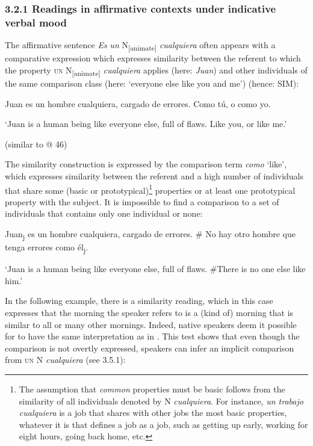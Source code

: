 \documentclass[output=paper]{langscibook}
\begin{document}
\subsubsection{\textbf{3.2.1} \textbf{Readings} \textbf{in} \textbf{affirmative} \textbf{contexts} \textbf{under} \textbf{indicative} \textbf{verbal} \textbf{mood}}

The affirmative sentence \textit{Es} \textit{un} N\textsubscript{[animate]} \textit{cualquiera} often appears with a comparative expression which expresses similarity between the referent to which the property \textsc{un} N\textsubscript{[animate]} \textit{cualquiera} applies (here: \textit{Juan}) and other individuals of the same comparison class (here: ‘everyone else like you and me’) (hence: SIM):

  Juan es un hombre cualquiera, cargado de errores. Como tú, o como yo.

  ‘Juan is a human being like everyone else, full of flaws. Like you, or like me.’

  (similar to @ 46)

The similarity construction is expressed by the comparison term \textit{como} ‘like’, which expresses similarity between the referent and a high number of individuals that share some (basic or prototypical)\footnote{ \textrm{The assumption that} \textrm{\textit{common}} \textrm{properties must be basic follows from the similarity of all individuals denoted by N} \textrm{\textit{cualquiera}}\textrm{. For instance,} \textrm{\textit{un trabajo cualquiera}} \textrm{is a job that shares with other jobs the most basic properties, whatever it is that defines a job as a job, such as getting up early, working for eight hours, going back home, etc.}} properties or at least one prototypical property with the subject. It is impossible to find a comparison to a set of individuals that contains only one individual or none:

  Juan\textsubscript{j} es un hombre cualquiera, cargado de errores. \# No hay otro hombre que tenga errores como él\textsubscript{j}.

  ‘Juan is a human being like everyone else, full of flaws. \#There is no one else like him.’

In the following example, there is a similarity reading, which in this case expresses that the morning the speaker refers to is a (kind of) morning that is similar to all or many other mornings. Indeed, native speakers deem it possible for  to have the same interpretation as in . This test shows that even though the comparison is not overtly expressed, speakers can infer an implicit comparison from \textsc{un} N \textit{cualquiera} (see 3.5.1):
\end{document}

